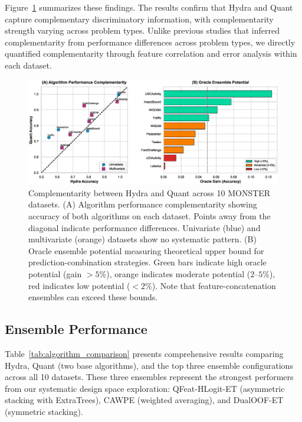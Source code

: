 \documentclass[pdflatex,sn-basic]{sn-jnl}           %
\theoremstyle{thmstyleone}%
\theoremstyle{thmstyletwo}%
\theoremstyle{thmstylethree}%
\begin{document}
Figure~\ref{fig:complementarity} summarizes these findings. The results confirm that Hydra and Quant capture complementary discriminatory information, with complementarity strength varying across problem types. Unlike previous studies that inferred complementarity from performance differences across problem types, we directly quantified complementarity through feature correlation and error analysis within each dataset.

\begin{figure}[t]
\centering
\includegraphics[width=\textwidth]{figure1_complementarity}
\caption{Complementarity between Hydra and Quant across 10 MONSTER datasets. (A) Algorithm performance complementarity showing accuracy of both algorithms on each dataset. Points away from the diagonal indicate performance differences. Univariate (blue) and multivariate (orange) datasets show no systematic pattern. (B) Oracle ensemble potential measuring theoretical upper bound for prediction-combination strategies. Green bars indicate high oracle potential (gain $>5\%$), orange indicates moderate potential ($2$--$5\%$), red indicates low potential ($<2\%$). Note that feature-concatenation ensembles can exceed these bounds.}\label{fig:complementarity}
\end{figure}

\subsection{Ensemble Performance}

Table~\ref{tab:algorithm_comparison} presents comprehensive results comparing Hydra, Quant (two base algorithms), and the top three ensemble configurations across all 10 datasets. These three ensembles represent the strongest performers from our systematic design space exploration: QFeat-HLogit-ET (asymmetric stacking with ExtraTrees), CAWPE (weighted averaging), and DualOOF-ET (symmetric stacking).


\end{document}
